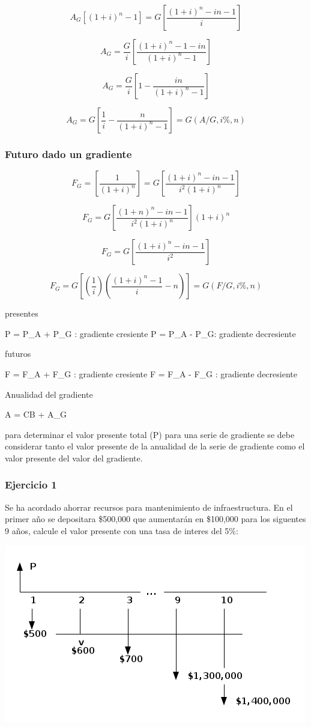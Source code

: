 \documentclass[11pt]{article}
\begin{document}
\[
A_G\left[(1+i)^n-1\right] = G\left[ \frac{(1+i)^n - in - 1}{i} \right]
\]


\[
A_G = \frac{G}{i} [ \frac{ (1+i)^n - 1 - in }{ (1+i)^n - 1} ]
\]

\[
A_G= \frac{G}{i} [ 1 - \frac{in}{ (1+i)^n - 1} ]
\]

\[
A_G = G \left[ \frac{1}{i} - \frac{n}{(1+i)^n-1}\right] = G(A/G,i\%,n) 
\]

\subsubsection*{Futuro dado un gradiente}
\label{sec:org8bd4e4c}

\[
F_G = \left[ \frac{1}{(1+i)^n} \right] = G\left[ \frac{(1+i)^n-in-1}{i^2(1+i)^n} \right]
\]

\[
F_G = G\left[ \frac{(1+n)^n - in - 1}{i^2(1+i)^n} \right] (1+i)^n
\]

\[
F_G = G \left[ \frac{(1+i)^n - in - 1}{i^2} \right]
\]

\[
F_G = G \left[ (\frac{1}{i}) (\frac{(1+i)^n-1}{i} - n) \right] = G(F/G,i\%, n)
\]


presentes

P = P\_A + P\_G : gradiente cresiente
P = P\_A - P\_G: gradiente decresiente

futuros

F = F\_A + F\_G : gradiente cresiente
F = F\_A - F\_G : gradiente decresiente

Anualidad del gradiente

A = CB + A\_G 


para determinar el valor presente total (P) para una serie de gradiente se debe considerar tanto el valor presente de la anualidad de la serie de gradiente como el valor presente del valor del gradiente.

\subsubsection*{Ejercicio 1}
\label{sec:org8188701}
Se ha acordado ahorrar recursos para mantenimiento de infraestructura. En el primer año se depositara \$500,000 que aumentarán en \$100,000 para los siguentes 9 años, calcule el valor presente con una tasa de interes del 5\%:

\begin{center}
\includegraphics[width=.9\linewidth]{fsdfds.png}
\end{center}
\end{document}
